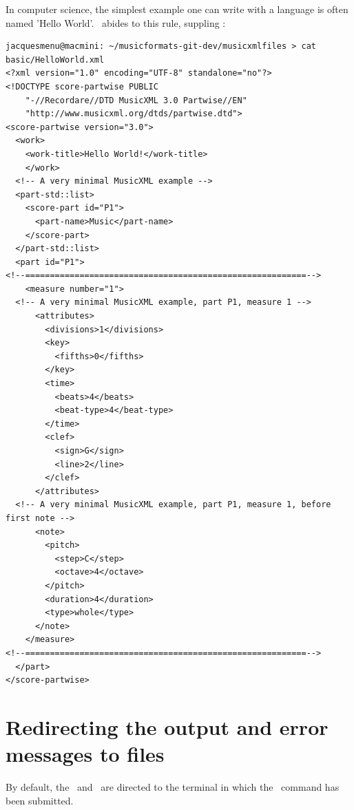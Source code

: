 In computer science, the simplest example one can write with a language is often named 'Hello World'. \mf\ abides to this rule, suppling :
\begin{lstlisting}[language=MusicXML]
jacquesmenu@macmini: ~/musicformats-git-dev/musicxmlfiles > cat basic/HelloWorld.xml
<?xml version="1.0" encoding="UTF-8" standalone="no"?>
<!DOCTYPE score-partwise PUBLIC
    "-//Recordare//DTD MusicXML 3.0 Partwise//EN"
    "http://www.musicxml.org/dtds/partwise.dtd">
<score-partwise version="3.0">
  <work>
    <work-title>Hello World!</work-title>
    </work>
  <!-- A very minimal MusicXML example -->
  <part-std::list>
    <score-part id="P1">
      <part-name>Music</part-name>
    </score-part>
  </part-std::list>
  <part id="P1">
<!--=========================================================-->
    <measure number="1">
  <!-- A very minimal MusicXML example, part P1, measure 1 -->
      <attributes>
        <divisions>1</divisions>
        <key>
          <fifths>0</fifths>
        </key>
        <time>
          <beats>4</beats>
          <beat-type>4</beat-type>
        </time>
        <clef>
          <sign>G</sign>
          <line>2</line>
        </clef>
      </attributes>
  <!-- A very minimal MusicXML example, part P1, measure 1, before first note -->
      <note>
        <pitch>
          <step>C</step>
          <octave>4</octave>
        </pitch>
        <duration>4</duration>
        <type>whole</type>
      </note>
    </measure>
<!--=========================================================-->
  </part>
</score-partwise>
\end{lstlisting}


\section{Redirecting the output and error messages to files}

By default, the \standardOutput\ and \standardError\ are directed to the terminal in which the \xmlToLy\ command has been submitted.


